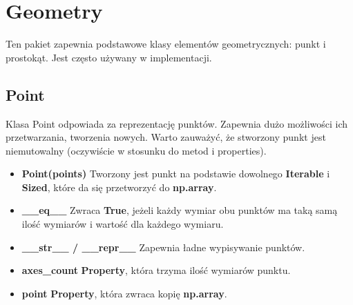 \documentclass[a4paper, 12pt]{article}
\begin{document}
  \section{Geometry}
    \quad Ten pakiet zapewnia podstawowe klasy elementów geometrycznych: punkt i prostokąt. Jest często używany w implementacji.

    \subsection{Point}
      \quad Klasa Point odpowiada za reprezentację punktów. Zapewnia dużo możliwości ich przetwarzania, tworzenia nowych. Warto zauważyć, że stworzony punkt jest niemutowalny (oczywiście w stosunku do metod i properties).

      \begin{itemize}
          \item \textbf{Point(points)} \vspace{6pt}\newline
          \quad Tworzony jest punkt na podstawie dowolnego \textbf{Iterable} i \textbf{Sized}, które da się przetworzyć do \textbf{np.array}.
          \vspace{6pt}
          
          \item \textbf{\_\_eq\_\_} \vspace{6pt}\newline
          \quad Zwraca \textbf{True}, jeżeli każdy wymiar obu punktów ma taką samą ilość wymiarów i  wartość dla każdego wymiaru.
          \vspace{6pt}
          
          \item \textbf{\_\_str\_\_ / \_\_repr\_\_} \vspace{6pt}\newline
          \quad Zapewnia ładne wypisywanie punktów.
          \vspace{6pt}
          
          \item \textbf{axes\_count} \vspace{6pt}\newline
          \quad \textbf{Property}, która trzyma ilość wymiarów punktu.
          \vspace{6pt}
          
          \item \textbf{point} \vspace{6pt}\newline
          \quad \textbf{Property}, która zwraca kopię \textbf{np.array}.
          \vspace{6pt}
          

\end{itemize}
\end{document}
